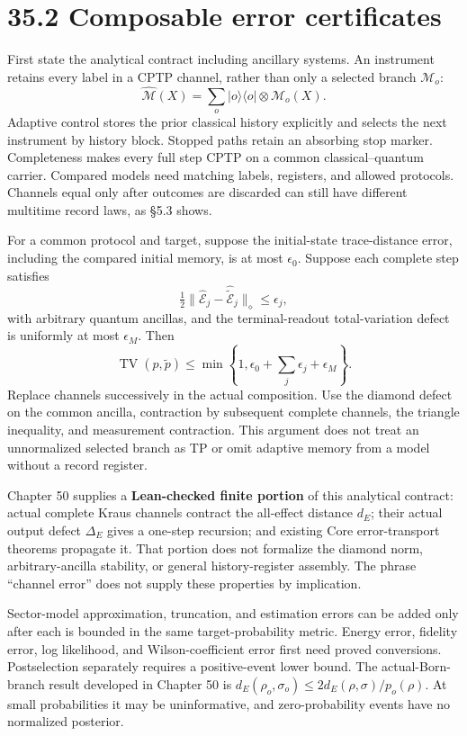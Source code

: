 \documentclass[
  11pt,
  oneside]{book}
\begin{document}
\section{35.2 Composable error certificates}

First state the analytical contract including ancillary systems. An
instrument retains every label in a CPTP channel, rather than only a
selected branch \(\mathcal M_o\): \[
\widehat{\mathcal M}(X)=\sum_o|o\rangle\langle o|\otimes\mathcal M_o(X).
\] Adaptive control stores the prior classical history explicitly and
selects the next instrument by history block. Stopped paths retain an
absorbing stop marker. Completeness makes every full step CPTP on a
common classical--quantum carrier. Compared models need matching labels,
registers, and allowed protocols. Channels equal only after outcomes are
discarded can still have different multitime record laws, as §5.3 shows.

For a common protocol and target, suppose the initial-state
trace-distance error, including the compared initial memory, is at most
\(\epsilon_0\). Suppose each complete step satisfies \[
\tfrac12\|\widehat{\mathcal E}_j-\widehat{\widetilde{\mathcal E}}_j\|_\diamond
\le\epsilon_j,
\] with arbitrary quantum ancillas, and the terminal-readout
total-variation defect is uniformly at most \(\epsilon_M\). Then \[
\operatorname{TV}(p,\widetilde p)
\le\min\left\{1,\epsilon_0+\sum_j\epsilon_j+\epsilon_M\right\}.
\] Replace channels successively in the actual composition. Use the
diamond defect on the common ancilla, contraction by subsequent complete
channels, the triangle inequality, and measurement contraction. This
argument does not treat an unnormalized selected branch as TP or omit
adaptive memory from a model without a record register.

Chapter 50 supplies a \textbf{Lean-checked finite portion} of this
analytical contract: actual complete Kraus channels contract the
all-effect distance \(d_E\); their actual output defect \(\Delta_E\)
gives a one-step recursion; and existing Core error-transport theorems
propagate it. That portion does not formalize the diamond norm,
arbitrary-ancilla stability, or general history-register assembly. The
phrase ``channel error'' does not supply these properties by
implication.

Sector-model approximation, truncation, and estimation errors can be
added only after each is bounded in the same target-probability metric.
Energy error, fidelity error, log likelihood, and Wilson-coefficient
error first need proved conversions. Postselection separately requires a
positive-event lower bound. The actual-Born-branch result developed in
Chapter 50 is \(d_E(\rho_o,\sigma_o)\le2d_E(\rho,\sigma)/p_o(\rho)\). At
small probabilities it may be uninformative, and zero-probability events
have no normalized posterior.
\end{document}
